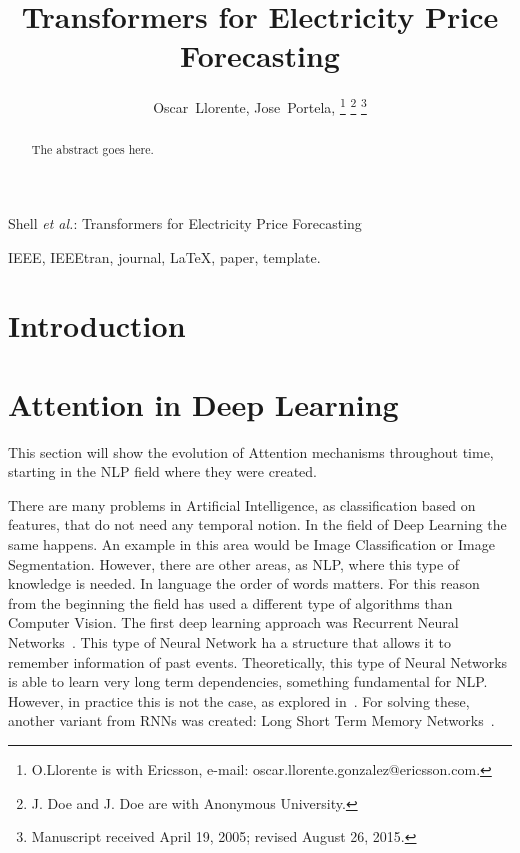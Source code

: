 \documentclass[journal]{IEEEtran}
\begin{document}
\title{Transformers for Electricity Price Forecasting}


\author{Oscar~Llorente,
        Jose~Portela,
\thanks{O.Llorente is with Ericsson, e-mail: oscar.llorente.gonzalez@ericsson.com.}%
\thanks{J. Doe and J. Doe are with Anonymous University.}%
\thanks{Manuscript received April 19, 2005; revised August 26, 2015.}}



%
{Shell \MakeLowercase{\textit{et al.}}: Transformers for Electricity Price Forecasting}




\maketitle

\begin{abstract}
The abstract goes here.
\end{abstract}

\begin{IEEEkeywords}
IEEE, IEEEtran, journal, \LaTeX, paper, template.
\end{IEEEkeywords}

\IEEEpeerreviewmaketitle



\section{Introduction}

\section{Attention in Deep Learning}
This section will show the evolution of Attention mechanisms throughout time, starting in the NLP field where they were created.

There are many problems in Artificial Intelligence, as classification based on features, that do not need any temporal notion. In the field of Deep Learning the same happens. An example in this area would be Image Classification or Image Segmentation. However, there are other areas, as NLP, where this type of knowledge is needed. In language the order of words matters. For this reason from the beginning the field has used a different type of algorithms than Computer Vision. The first deep learning approach was Recurrent Neural Networks~\cite{rumelhartLearningInternalRepresentations1987}. This type of Neural Network ha a structure that allows it to remember information of past events. Theoretically, this type of Neural Networks is able to learn very long term dependencies, something fundamental for NLP. However, in practice this is not the case, as explored in~\cite{bengioLearningLongtermDependencies1994}. For solving these, another variant from RNNs was created: Long Short Term Memory Networks~\cite{hochreiterLongShortTermMemory1997}.
\end{document}
